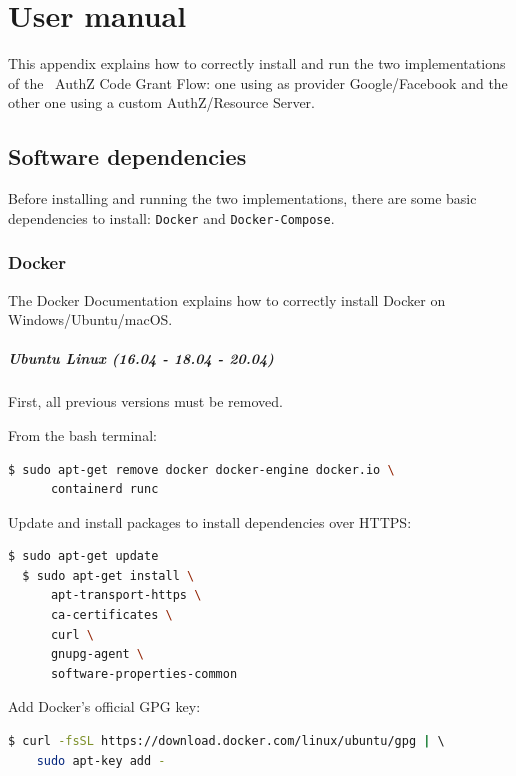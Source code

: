 
\appendix
\chapter{User manual}
This appendix explains how to correctly install and run the two implementations of the \oauth\ AuthZ Code Grant Flow: one using as provider Google/Facebook and the other one using a custom AuthZ/Resource Server.

\minitoc

\section{Software dependencies}
\label{appa}
Before installing and running the two implementations, there are some basic dependencies to install: \texttt{Docker} and \texttt{Docker-Compose}.

\subsection{Docker}
\label{ublin}
The Docker Documentation \cite{docker} explains how to correctly install Docker on Windows/Ubuntu/macOS.

\paragraph{Ubuntu Linux (16.04 - 18.04 - 20.04)} First, all previous versions must be removed. 

\noindent From the bash terminal:
\begin{lstlisting}[language=bash]
  $ sudo apt-get remove docker docker-engine docker.io \
      containerd runc
\end{lstlisting}

\noindent Update and install packages to install dependencies over HTTPS:
\begin{lstlisting}[language=bash]
  $ sudo apt-get update
  $ sudo apt-get install \
      apt-transport-https \
      ca-certificates \
      curl \
      gnupg-agent \
      software-properties-common
\end{lstlisting}

\noindent Add Docker’s official GPG key:
\begin{lstlisting}[language=bash, showstringspaces=false, basicstyle=\ttfamily]
  $ curl -fsSL https://download.docker.com/linux/ubuntu/gpg | \ 
    sudo apt-key add -
\end{lstlisting}

